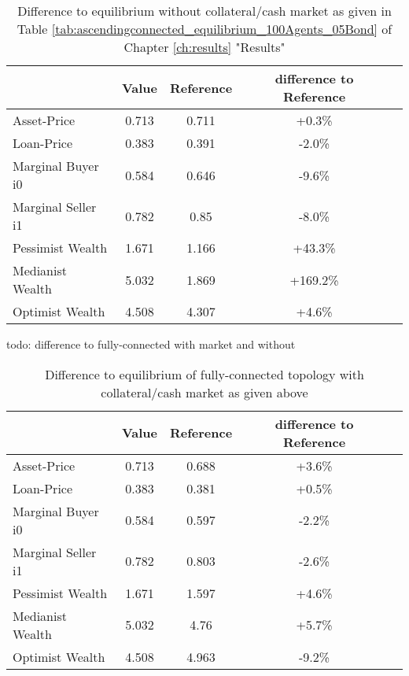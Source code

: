 \documentclass[Bachelorarbeit.tex]{subfiles}
\begin{document}
\begin{table}[h]
	\caption{Difference to equilibrium without collateral/cash market as given in Table \ref{tab:ascendingconnected_equilibrium_100Agents_05Bond} of Chapter \ref{ch:results} "Results"}
	\centering
	\begin{tabular} { l c c c r }
		& Value & Reference & difference to Reference \\
		\hline
		Asset-Price & 0.713 & 0.711 & +0.3\% \\
		Loan-Price & 0.383 & 0.391 & -2.0\% \\
		Marginal Buyer i0 & 0.584 & 0.646 & -9.6\% \\
		Marginal Seller i1 & 0.782 & 0.85 & -8.0\% \\
		\hline
		Pessimist Wealth & 1.671 & 1.166 & +43.3\% \\
		Medianist Wealth & 5.032 & 1.869 & +169.2\% \\
		Optimist Wealth & 4.508 & 4.307 & +4.6\% \\
		\hline
	\end{tabular}
\end{table}

todo: difference to fully-connected with market and without

\begin{table}[h]
	\caption{Difference to equilibrium of fully-connected topology with collateral/cash market as given above}
	\centering
	\begin{tabular} { l c c c r }
		& Value & Reference & difference to Reference \\
		\hline
		Asset-Price & 0.713 & 0.688 & +3.6\% \\
		Loan-Price & 0.383 & 0.381 & +0.5\% \\
		Marginal Buyer i0 & 0.584 & 0.597 & -2.2\% \\
		Marginal Seller i1 & 0.782 & 0.803 & -2.6\% \\
		\hline
		Pessimist Wealth & 1.671 & 1.597 & +4.6\% \\
		Medianist Wealth & 5.032 & 4.76 & +5.7\% \\
		Optimist Wealth & 4.508 & 4.963 & -9.2\% \\
		\hline
	\end{tabular}
\end{table}
\end{document}
